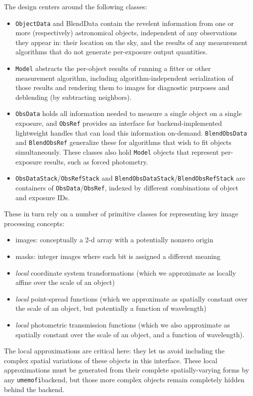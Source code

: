 \documentclass[\docopts]{\docclass}
\begin{document}
The design centers around the following classes:
\begin{itemize}
\item \texttt{ObjectData} and {{BlendData}} contain the revelent information from one or more (respectively) astronomical objects, independent of any observations they appear in: their location on the sky, and the results of any measurement algorithms that do not generate per-exposure output quantities.
\item \texttt{Model} abstracts the per-object results of running a fitter or other measurement algorithm, including algorithm-independent serialization of those results and rendering them to images for diagnostic purposes and deblending (by subtracting neighbors).
\item \texttt{ObsData} holds all information needed to measure a single object on a single exposure, and \texttt{ObsRef} provides an interface for backend-implemented lightweight handles that can load this information on-demand.  \texttt{BlendObsData} and \texttt{BlendObsRef} generalize these for algorithms that wish to fit objects simultaneously.  These classes also hold \texttt{Model} objects that represent per-exposure results, such as forced photometry.
\item \texttt{ObsDataStack}/\texttt{ObsRefStack} and \texttt{BlendObsDataStack}/\texttt{BlendObsRefStack} are containers of \texttt{ObsData}/\texttt{ObsRef}, indexed by different combinations of object and exposure IDs.
\end{itemize}
These in turn rely on a number of primitive classes for representing key image processing concepts:
\begin{itemize}
\item images: conceptually a 2-d array with a potentially nonzero origin
\item masks: integer images where each bit is assigned a different meaning
\item \emph{local} coordinate system transformations (which we approximate as locally affine over the scale of an object)
\item \emph{local} point-spread functions (which we approximate as spatially constant over the scale of an object, but potentially a function of wavelength)
\item \emph{local} photometric transmission functions (which we also approximate as spatially constant over the scale of an object, and a function of wavelength).
\end{itemize}
The local approximations are critical here: they let us avoid including the complex spatial variations of these objects in this interface.  These local approximations must be generated from their complete spatially-varying forms by any \texttt{umemofi}backend, but those more complex objects remain completely hidden behind the backend.
\end{document}
